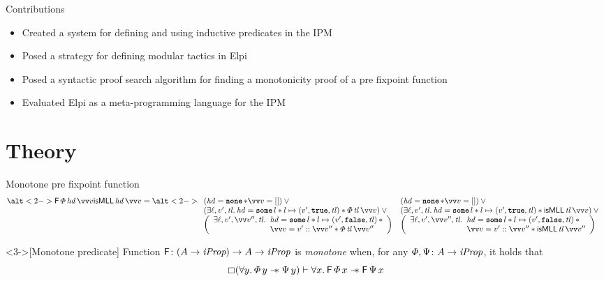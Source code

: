 \documentclass[aspectratio=169]{beamer}
\begin{document}
\begin{frame}{Contributions}
    \pause
    \begin{itemize}[<+->]
        \item Created a system for defining and using inductive predicates in the IPM
        \item Posed a strategy for defining modular tactics in Elpi
        \item Posed a syntactic proof search algorithm for finding a monotonicity proof of a pre fixpoint function
        \item Evaluated Elpi as a meta-programming language for the IPM
    \end{itemize}
\end{frame}

\section{Theory}
\begin{frame}{Monotone pre fixpoint function}
    \begin{align*}
        \alt<2->
        {\hopred\, \pred\, \hd\, \vect{\val}}{\isMLL\, \hd\, \vect{\val}} = \alt<2->{\isMLLFDef}{\isMLLRecDef}
    \end{align*}

    \begin{definition}<3->[Monotone predicate]
        Function $\textsf{\upshape F}\colon (A \to \textit{iProp}) \to  A \to \textit{iProp}$ is \emph{monotone} when, for any $\varPhi, \Psi\colon A \to \textit{iProp}$, it holds that
        \[ \always(\All \varB. \pred\,\varB \wand \predB\,\varB) \proves \All \var. \hopred\,\pred\,\var \wand \hopred\,\predB\,\var\]
    \end{definition}
\end{frame}
\end{document}
